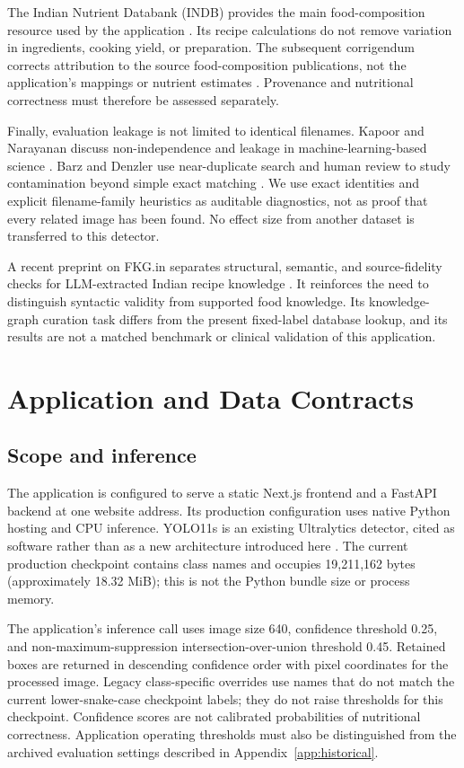 \documentclass[12pt,journal,draftclsnofoot,onecolumn]{IEEEtran}
\begin{document}
The Indian Nutrient Databank (INDB) provides the main food-composition resource used by the application \cite{development_indb_2024}. Its recipe calculations do not remove variation in ingredients, cooking yield, or preparation. The subsequent corrigendum corrects attribution to the source food-composition publications, not the application's mappings or nutrient estimates \cite{indb_corrigendum_2025}. Provenance and nutritional correctness must therefore be assessed separately.

Finally, evaluation leakage is not limited to identical filenames. Kapoor and Narayanan discuss non-independence and leakage in machine-learning-based science \cite{kapoor2023leakage}. Barz and Denzler use near-duplicate search and human review to study contamination beyond simple exact matching \cite{barz2020duplicates}. We use exact identities and explicit filename-family heuristics as auditable diagnostics, not as proof that every related image has been found. No effect size from another dataset is transferred to this detector.

A recent preprint on FKG.in separates structural, semantic, and source-fidelity checks for LLM-extracted Indian recipe knowledge \cite{gupta2026validatingfkg}. It reinforces the need to distinguish syntactic validity from supported food knowledge. Its knowledge-graph curation task differs from the present fixed-label database lookup, and its results are not a matched benchmark or clinical validation of this application.

\section{Application and Data Contracts}
\subsection{Scope and inference}
The application is configured to serve a static Next.js frontend and a FastAPI backend at one website address. Its production configuration uses native Python hosting and CPU inference. YOLO11s is an existing Ultralytics detector, cited as software rather than as a new architecture introduced here \cite{ultralytics2024}. The current production checkpoint contains \AuditClasses{} class names and occupies 19,211,162 bytes (approximately 18.32 MiB); this is not the Python bundle size or process memory.

The application's inference call uses image size 640, confidence threshold 0.25, and non-maximum-suppression intersection-over-union threshold 0.45. Retained boxes are returned in descending confidence order with pixel coordinates for the processed image. Legacy class-specific overrides use names that do not match the current lower-snake-case checkpoint labels; they do not raise thresholds for this checkpoint. Confidence scores are not calibrated probabilities of nutritional correctness. Application operating thresholds must also be distinguished from the archived evaluation settings described in Appendix~\ref{app:historical}.
\end{document}
